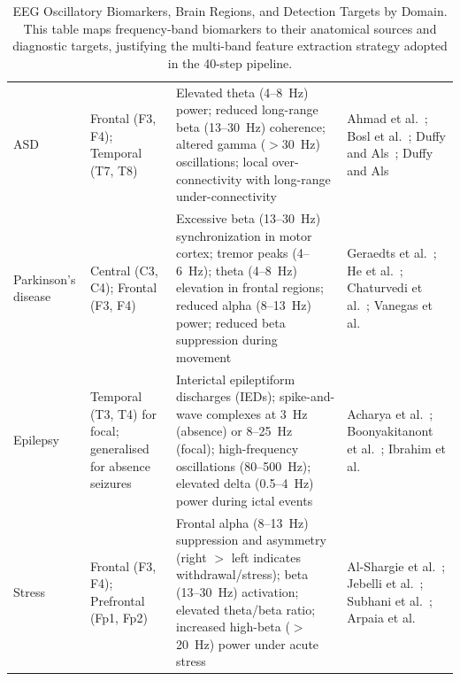 \begin{table}[H]
\tablestripes\tablefontsize
\caption[EEG Oscillatory Biomarkers, Brain Regions, and Detection]{EEG Oscillatory Biomarkers, Brain Regions, and Detection Targets by Domain. This table maps frequency-band biomarkers to their anatomical sources and diagnostic targets, justifying the multi-band feature extraction strategy adopted in the 40-step pipeline.}
\tablefontsize
\begin{tabularx}{\textwidth}{@{} >{\raggedright\arraybackslash}p{2.0cm} >{\raggedright\arraybackslash}p{2.0cm} L L @{}}
\toprule
{} &  &  &  \\
\midrule
ASD & Frontal (F3, F4); Temporal (T7, T8) & Elevated theta (4--8~Hz) power; reduced long-range beta (13--30~Hz) coherence; altered gamma ($>$30~Hz) oscillations; local over-connectivity with long-range under-connectivity & Ahmad et al.~\cite{ahmad2020eeg}; Bosl et al.~\cite{bosl2018eeg}; Duffy and Als~\cite{duffy2019eeg}; Duffy and Als~\cite{duffy2012coherence} \\
\addlinespace
Parkinson's disease & Central (C3, C4); Frontal (F3, F4) & Excessive beta (13--30~Hz) synchronization in motor cortex; tremor peaks (4--6~Hz); theta (4--8~Hz) elevation in frontal regions; reduced alpha (8--13~Hz) power; reduced beta suppression during movement & Geraedts et al.~\cite{geraedts2018eeg}; He et al.~\cite{he2021identification}; Chaturvedi et al.~\cite{chaturvedi2017pd}; Vanegas et al.~\cite{vanegas2018pd} \\
\addlinespace
Epilepsy & Temporal (T3, T4) for focal; generalised for absence seizures & Interictal epileptiform discharges (IEDs); spike-and-wave complexes at 3~Hz (absence) or 8--25~Hz (focal); high-frequency oscillations (80--500~Hz); elevated delta (0.5--4~Hz) power during ictal events & Acharya et al.~\cite{acharya2018epilepsy}; Boonyakitanont et al.~\cite{boonyakitanont2020review}; Ibrahim et al.~\cite{ibrahim2018epilepsy} \\
\addlinespace
Stress & Frontal (F3, F4); Prefrontal (Fp1, Fp2) & Frontal alpha (8--13~Hz) suppression and asymmetry (right $>$ left indicates withdrawal/stress); beta (13--30~Hz) activation; elevated theta/beta ratio; increased high-beta ($>$20~Hz) power under acute stress & Al-Shargie et al.~\cite{alshargie2018mental}; Jebelli et al.~\cite{jebelli2018eeg}; Subhani et al.~\cite{subhani2017stress}; Arpaia et al.~\cite{arpaia2020wearable} \\

\end{tabularx}
\end{table}
